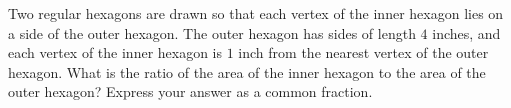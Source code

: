 Two regular hexagons are drawn so that each vertex of the inner hexagon lies on a side of the outer hexagon. The outer hexagon has sides of length $4$ inches, and each vertex of the inner hexagon is $1$ inch from the nearest vertex of the outer hexagon. What is the ratio of the area of the inner hexagon to the area of the outer hexagon? Express your answer as a common fraction.
